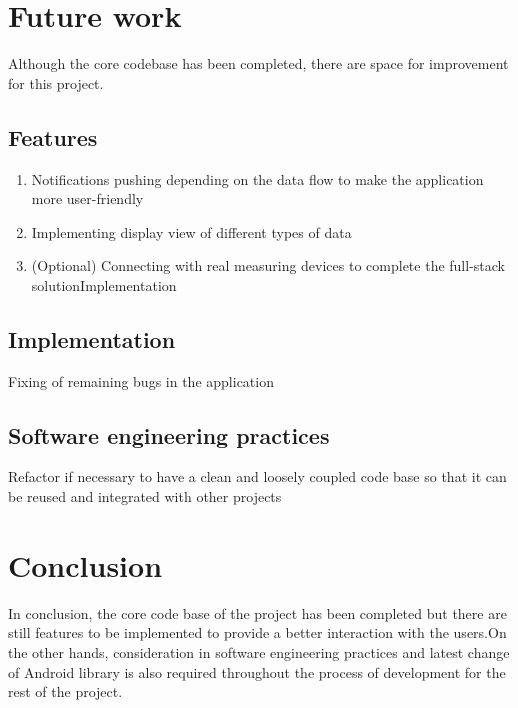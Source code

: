 \section{Future work} \label{sec:Work done so far}
Although the core codebase has been completed, there are space for improvement for this project.
\subsection{Features}
\begin{enumerate}
    \item Notifications pushing depending on the data flow to make the application more
        user-friendly
    \item Implementing display view of different types of data
    \item (Optional) Connecting with real measuring devices
        to complete the full-stack solutionImplementation
\end{enumerate}

\subsection{Implementation}
Fixing of remaining bugs in the application

\subsection{Software engineering practices}
Refactor if necessary to have a clean and loosely coupled code base so that it can be reused and integrated with other projects

\section{Conclusion}
In conclusion, the core code base of the project has been completed but there are still features to
be implemented to provide a better interaction with the users.On the other hands, consideration in software engineering
practices and latest change of Android library is also required throughout the process of development for the rest of
the project. \cite{DUMMY:1}

 



